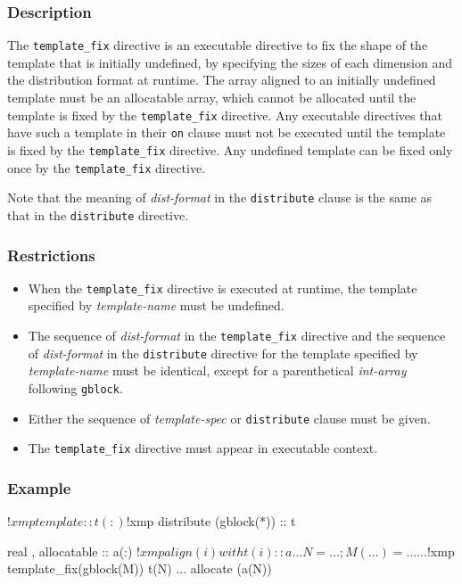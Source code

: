 \subsubsection*{Description}

The {\tt template\_fix} directive is an executable directive to fix the
shape of the template that is initially undefined, by specifying the
sizes of each dimension and the distribution format at runtime. The array
aligned to an initially undefined template must be an allocatable
array, which cannot be allocated until the template is fixed by the
{\tt template\_fix} directive. Any executable directives that have such a
template in their {\tt on} clause must not be executed until the
template is fixed by the
{\tt template\_fix} directive. Any undefined template can be fixed only
once by the {\tt template\_fix} directive. 

Note that the meaning of
{\it dist-format} in the {\tt distribute} clause is the same as that in
the {\tt distribute} directive.

\subsubsection*{Restrictions}
\begin{itemize}
\item When the {\tt template\_fix} directive is executed at runtime, the
template specified by {\it template-name} must be undefined.
\item The sequence
of {\it dist-format} in the {\tt template\_fix} directive and the
      sequence of {\it dist-format} in the {\tt distribute} directive
      for the template specified by {\it template-name} must be
      identical, except for a parenthetical {\it int-array} following
      {\tt gblock}.
\item Either the sequence of {\it template-spec} or {\tt distribute}
  clause must be given. 
\item The {\tt template\_fix} directive must appear in executable
      context.
\end{itemize}

\subsubsection*{Example}

\begin{Fexample}
!$xmp template :: t(:)
!$xmp distribute (gblock(*)) :: t

      real , allocatable :: a(:)
!$xmp align (i) with t(i) :: a
      ...
      N = ...; M(...) = ...
      ...
!$xmp template_fix(gblock(M)) t(N)
      ...
      allocate (a(N))
\end{Fexample}

